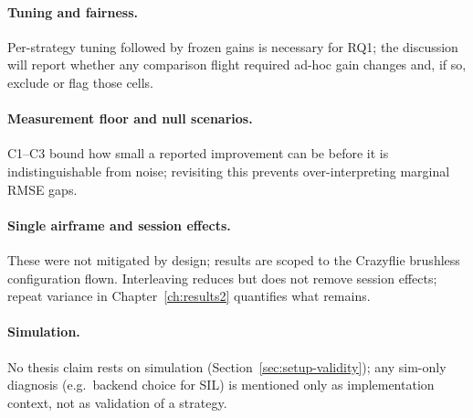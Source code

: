 \paragraph{Tuning and fairness.} Per-strategy tuning followed by frozen gains is necessary for RQ1;
the discussion will report whether any comparison flight required ad-hoc gain changes and, if so,
exclude or flag those cells.

\paragraph{Measurement floor and null scenarios.} C1--C3 bound how small a reported improvement can
be before it is indistinguishable from noise; revisiting this prevents over-interpreting marginal
RMSE gaps.

\paragraph{Single airframe and session effects.} These were not mitigated by design; results are
scoped to the Crazyflie brushless configuration flown. Interleaving reduces but does not remove
session effects; repeat variance in Chapter~\ref{ch:results2} quantifies what remains.

\paragraph{Simulation.} No thesis claim rests on simulation (Section~\ref{sec:setup-validity});
any sim-only diagnosis (e.g.\ backend choice for SIL) is mentioned only as implementation context,
not as validation of a strategy.

